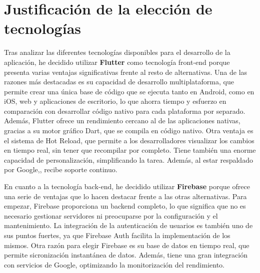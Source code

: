 \documentclass{article}
\begin{document}
\section{Justificación de la elección de tecnologías}
Tras analizar las diferentes tecnologías disponibles para el desarrollo de la aplicación, he decidido utilizar \textbf{Flutter} como tecnología front-end 
porque presenta varias ventajas significativas frente al resto de alternativas. Una de las razones más destacadas es su capacidad de desarrollo multiplataforma, 
que permite crear una única base de código que se ejecuta tanto en Android, como en iOS, web y aplicaciones de escritorio, lo que ahorra tiempo 
y esfuerzo en comparación con desarrollar código nativo para cada plataforma por separado. Además, Flutter ofrece un rendimiento cercano al 
de las aplicaciones nativas, gracias a su motor gráfico Dart, que se compila en código nativo. Otra ventaja es el sistema de Hot Reload, que permite 
a los desarrolladores visualizar los cambios en tiempo real, sin tener que recompilar por completo. Tiene también una enorme capacidad de 
personalización, simplificando la tarea. Además, al estar respaldado por Google,, recibe soporte continuo.



En cuanto a la tecnología back-end, he decidido utilizar \textbf{Firebase} porque ofrece una serie de ventajas que lo hacen destacar frente a las
otras alternativas. Para empezar, Firebase proporciona un backend completo, lo que significa que no es necesario gestionar servidores ni 
preocuparse por la configuración y el mantenimiento. La integración de la autenticación de usuarios es también uno de sus puntos fuertes, ya que 
Firebase Auth facilita la implementación de los mismos. Otra razón para elegir Firebase es su base de datos en tiempo real, que permite 
sicronización instantánea de datos. Además, tiene una gran integración con servicios de Google, optimizando la monitorización del rendimiento.
\end{document}
